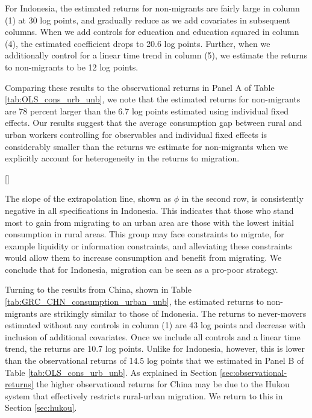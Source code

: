 For Indonesia, the estimated returns for non-migrants are fairly large in column (1) at 30 log points, and gradually reduce as we add covariates in subsequent columns.
When we add controls for education and education squared in column (4), the estimated coefficient drops to 20.6 log points. 
Further, when we additionally control for a linear time trend in column (5), we estimate the returns to non-migrants to be 12 log points.

Comparing these results to the observational returns in Panel A of Table \ref{tab:OLS_cons_urb_unb}, we note that the estimated returns for non-migrants are 78 percent larger than the 6.7 log points estimated using individual fixed effects.
Our results suggest that the average consumption gap between rural and urban workers controlling for observables and individual fixed effects is considerably smaller than the returns we estimate for non-migrants when we explicitly account for heterogeneity in the returns to migration.

[\GRCnotesIDNcanonical]


The slope of the extrapolation line, shown as $\phi$ in the second row, is consistently negative in all specifications in Indonesia. This indicates that those who stand most to gain from migrating to an urban area are those with the lowest initial consumption in rural areas. This group may face constraints to migrate, for example liquidity or information constraints, and alleviating these constraints would allow them to increase consumption and benefit from migrating. 
We conclude that for Indonesia, migration can be seen as a pro-poor strategy.

Turning to the results from China, shown in Table \ref{tab:GRC_CHN_consumption_urban_unb}, the estimated returns to non-migrants are strikingly similar to those of Indonesia. 
The returns to never-movers estimated without any controls in column (1) are 43 log points and decrease with inclusion of additional covariates. 
Once we include all controls and a linear time trend, the returns are 10.7 log points. Unlike for Indonesia, however, this is lower than the observational returns of 14.5 log points that we estimated in Panel B of Table \ref{tab:OLS_cons_urb_unb}. 
As explained in Section \ref{sec:observational-returns} the higher observational returns for China may be due to the Hukou system that effectively restricts rural-urban migration.
We return to this in Section \ref{sec:hukou}.

